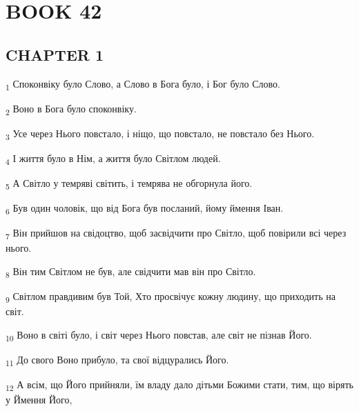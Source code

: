 \section{BOOK 42}
\subsection{CHAPTER 1}
\begin{tcolorbox}
\textsubscript{1} Споконвіку було Слово, а Слово в Бога було, і Бог було Слово.
\end{tcolorbox}
\begin{tcolorbox}
\textsubscript{2} Воно в Бога було споконвіку.
\end{tcolorbox}
\begin{tcolorbox}
\textsubscript{3} Усе через Нього повстало, і ніщо, що повстало, не повстало без Нього.
\end{tcolorbox}
\begin{tcolorbox}
\textsubscript{4} І життя було в Нім, а життя було Світлом людей.
\end{tcolorbox}
\begin{tcolorbox}
\textsubscript{5} А Світло у темряві світить, і темрява не обгорнула його.
\end{tcolorbox}
\begin{tcolorbox}
\textsubscript{6} Був один чоловік, що від Бога був посланий, йому ймення Іван.
\end{tcolorbox}
\begin{tcolorbox}
\textsubscript{7} Він прийшов на свідоцтво, щоб засвідчити про Світло, щоб повірили всі через нього.
\end{tcolorbox}
\begin{tcolorbox}
\textsubscript{8} Він тим Світлом не був, але свідчити мав він про Світло.
\end{tcolorbox}
\begin{tcolorbox}
\textsubscript{9} Світлом правдивим був Той, Хто просвічує кожну людину, що приходить на світ.
\end{tcolorbox}
\begin{tcolorbox}
\textsubscript{10} Воно в світі було, і світ через Нього повстав, але світ не пізнав Його.
\end{tcolorbox}
\begin{tcolorbox}
\textsubscript{11} До свого Воно прибуло, та свої відцурались Його.
\end{tcolorbox}
\begin{tcolorbox}
\textsubscript{12} А всім, що Його прийняли, їм владу дало дітьми Божими стати, тим, що вірять у Ймення Його,
\end{tcolorbox}
